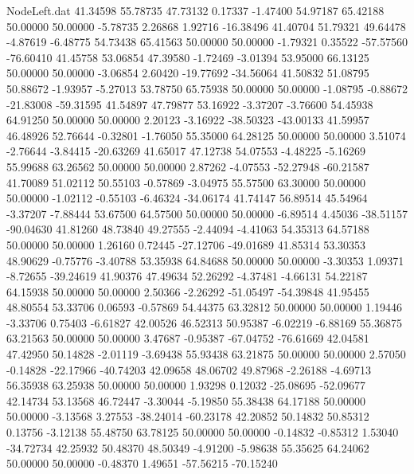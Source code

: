 \begin{filecontents}{NodeLeft.dat}
  41.34598   55.78735   47.73132     0.17337   -1.47400   54.97187   65.42188   50.00000   50.00000   -5.78735    2.26868    1.92716  -16.38496
  41.40704   51.79321   49.64478    -4.87619   -6.48775   54.73438   65.41563   50.00000   50.00000   -1.79321    0.35522  -57.57560  -76.60410
  41.45758   53.06854   47.39580    -1.72469   -3.01394   53.95000   66.13125   50.00000   50.00000   -3.06854    2.60420  -19.77692  -34.56064
  41.50832   51.08795   50.88672    -1.93957   -5.27013   53.78750   65.75938   50.00000   50.00000   -1.08795   -0.88672  -21.83008  -59.31595
  41.54897   47.79877   53.16922    -3.37207   -3.76600   54.45938   64.91250   50.00000   50.00000    2.20123   -3.16922  -38.50323  -43.00133
  41.59957   46.48926   52.76644    -0.32801   -1.76050   55.35000   64.28125   50.00000   50.00000    3.51074   -2.76644   -3.84415  -20.63269
  41.65017   47.12738   54.07553    -4.48225   -5.16269   55.99688   63.26562   50.00000   50.00000    2.87262   -4.07553  -52.27948  -60.21587
  41.70089   51.02112   50.55103    -0.57869   -3.04975   55.57500   63.30000   50.00000   50.00000   -1.02112   -0.55103   -6.46324  -34.06174
  41.74147   56.89514   45.54964    -3.37207   -7.88444   53.67500   64.57500   50.00000   50.00000   -6.89514    4.45036  -38.51157  -90.04630
  41.81260   48.73840   49.27555    -2.44094   -4.41063   54.35313   64.57188   50.00000   50.00000    1.26160    0.72445  -27.12706  -49.01689
  41.85314   53.30353   48.90629    -0.75776   -3.40788   53.35938   64.84688   50.00000   50.00000   -3.30353    1.09371   -8.72655  -39.24619
  41.90376   47.49634   52.26292    -4.37481   -4.66131   54.22187   64.15938   50.00000   50.00000    2.50366   -2.26292  -51.05497  -54.39848
  41.95455   48.80554   53.33706     0.06593   -0.57869   54.44375   63.32812   50.00000   50.00000    1.19446   -3.33706    0.75403   -6.61827
  42.00526   46.52313   50.95387    -6.02219   -6.88169   55.36875   63.21563   50.00000   50.00000    3.47687   -0.95387  -67.04752  -76.61669
  42.04581   47.42950   50.14828    -2.01119   -3.69438   55.93438   63.21875   50.00000   50.00000    2.57050   -0.14828  -22.17966  -40.74203
  42.09658   48.06702   49.87968    -2.26188   -4.69713   56.35938   63.25938   50.00000   50.00000    1.93298    0.12032  -25.08695  -52.09677
  42.14734   53.13568   46.72447    -3.30044   -5.19850   55.38438   64.17188   50.00000   50.00000   -3.13568    3.27553  -38.24014  -60.23178
  42.20852   50.14832   50.85312     0.13756   -3.12138   55.48750   63.78125   50.00000   50.00000   -0.14832   -0.85312    1.53040  -34.72734
  42.25932   50.48370   48.50349    -4.91200   -5.98638   55.35625   64.24062   50.00000   50.00000   -0.48370    1.49651  -57.56215  -70.15240

\end{filecontents}
